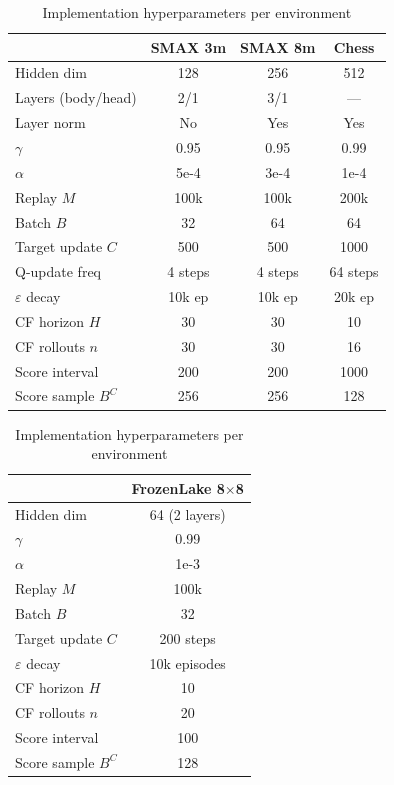 \documentclass[conference]{IEEEtran}
\begin{document}
\begin{table}[htbp]
\caption{Implementation hyperparameters per environment}
\label{tab:impl}
\begin{center}
\begin{tabular}{|l|c|c|c|}
\hline
 & \textbf{SMAX 3m} & \textbf{SMAX 8m} & \textbf{Chess} \\
\hline
Hidden dim      & 128   & 256   & 512   \\
Layers (body/head) & 2/1 & 3/1 & ---   \\
Layer norm      & No    & Yes   & Yes   \\
$\gamma$        & 0.95  & 0.95  & 0.99  \\
$\alpha$        & 5e-4  & 3e-4  & 1e-4  \\
Replay $M$      & 100k  & 100k  & 200k  \\
Batch $B$       & 32    & 64    & 64    \\
Target update $C$ & 500 & 500  & 1000  \\
Q-update freq   & 4 steps & 4 steps & 64 steps \\
$\varepsilon$ decay & 10k ep & 10k ep & 20k ep \\
CF horizon $H$  & 30    & 30    & 10    \\
CF rollouts $n$ & 30    & 30    & 16    \\
Score interval  & 200   & 200   & 1000  \\
Score sample $B^C$ & 256 & 256 & 128  \\
\hline
\end{tabular}

\medskip
\begin{tabular}{|l|c|}
\hline
 & \textbf{FrozenLake 8$\times$8} \\
\hline
Hidden dim      & 64 (2 layers)      \\
$\gamma$        & 0.99               \\
$\alpha$        & 1e-3               \\
Replay $M$      & 100k               \\
Batch $B$       & 32                 \\
Target update $C$ & 200 steps        \\
$\varepsilon$ decay & 10k episodes   \\
CF horizon $H$  & 10                 \\
CF rollouts $n$ & 20                 \\
Score interval  & 100                \\
Score sample $B^C$ & 128            \\
\hline
\end{tabular}
\end{center}
\end{table}
\end{document}
